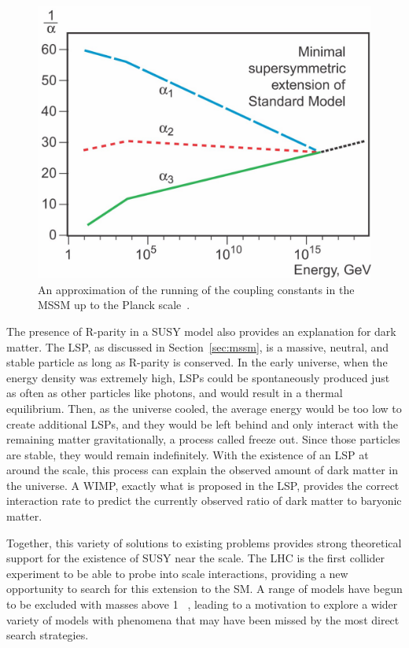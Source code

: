 \begin{figure}
\includegraphics[width=\fullfig]{figures/unification_susy.jpg}
\caption{An approximation of the running of the coupling constants in the \acs*{MSSM} up to the Planck scale~\cite{unification_plot}.}
\label{fig:unification_susy}
\end{figure}

The presence of R-parity in a \ac{SUSY} model also provides an explanation for dark matter.
The \ac{LSP}, as discussed in Section~\ref{sec:mssm}, is a massive, neutral, and stable particle as long as R-parity is conserved.
In the early universe, when the energy density was extremely high, \acp{LSP} could be spontaneously produced just as often as other particles like photons, and would result in a thermal equilibrium.
Then, as the universe cooled, the average energy would be too low to create additional \acp{LSP}, and they would be left behind and only interact with the remaining matter gravitationally, a process called freeze out.
Since those particles are stable, they would remain indefinitely. 
With the existence of an \ac{LSP} at around the \TeV scale, this process can explain the observed amount of dark matter in the universe.
A \ac{WIMP}, exactly what is proposed in the \ac{LSP}, provides the correct interaction rate to predict the currently observed ratio of dark matter to baryonic matter.

Together, this variety of solutions to existing problems provides strong theoretical support for the existence of \ac{SUSY} near the \TeV scale.
The \ac{LHC} is the first collider experiment to be able to probe into \TeV scale interactions, providing a new opportunity to search for this extension to the \ac{SM}.
A range of models have begun to be excluded with masses above 1 \TeV~\cite{pdg}, leading to a motivation to explore a wider variety of models with phenomena that may have been missed by the most direct search strategies.

